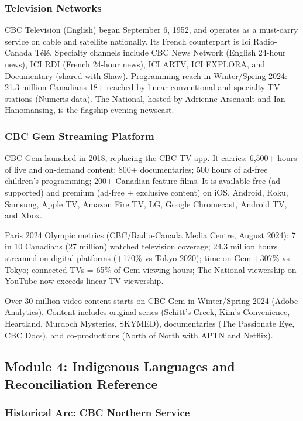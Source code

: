 \documentclass[11pt,letterpaper]{article}
\begin{document}
\subsubsection{Television Networks}

CBC Television (English) began September 6, 1952, and operates as a must-carry service on cable and satellite nationally. Its French counterpart is Ici Radio-Canada T\'{e}l\'{e}. Specialty channels include CBC News Network (English 24-hour news), ICI RDI (French 24-hour news), ICI ARTV, ICI EXPLORA, and Documentary (shared with Shaw). Programming reach in Winter/Spring 2024: 21.3 million Canadians 18+ reached by linear conventional and specialty TV stations (Numeris data). The National, hosted by Adrienne Arsenault and Ian Hanomansing, is the flagship evening newscast.

\subsubsection{CBC Gem Streaming Platform}

CBC Gem launched in 2018, replacing the CBC TV app. It carries: 6,500+ hours of live and on-demand content; 800+ documentaries; 500 hours of ad-free children's programming; 200+ Canadian feature films. It is available free (ad-supported) and premium (ad-free + exclusive content) on iOS, Android, Roku, Samsung, Apple TV, Amazon Fire TV, LG, Google Chromecast, Android TV, and Xbox.

Paris 2024 Olympic metrics (CBC/Radio-Canada Media Centre, August 2024): 7 in 10 Canadians (27 million) watched television coverage; 24.3 million hours streamed on digital platforms (+170\% vs Tokyo 2020); time on Gem +307\% vs Tokyo; connected TVs = 65\% of Gem viewing hours; The National viewership on YouTube now exceeds linear TV viewership.

Over 30 million video content starts on CBC Gem in Winter/Spring 2024 (Adobe Analytics). Content includes original series (Schitt's Creek, Kim's Convenience, Heartland, Murdoch Mysteries, SKYMED), documentaries (The Passionate Eye, CBC Docs), and co-productions (North of North with APTN and Netflix).

\subsection{Module 4: Indigenous Languages and Reconciliation Reference}

\subsubsection{Historical Arc: CBC Northern Service}
\end{document}
